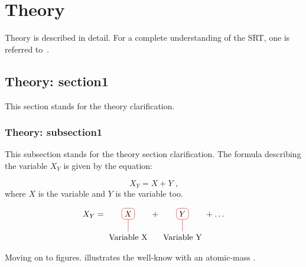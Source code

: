 \chapter{Theory}
\label{chapter:theory}

Theory is described in \gls{detail}.
For a complete understanding of the \acrshort{SRT}, one is referred to~\cite{ADP:Einstein:On_The_Electrodynamics_Of_Moving_Bodies}.


\section{Theory: section1}
\label{section:section1}

This section stands for the theory clarification.

\subsection{Theory: subsection1}
\label{subsection:subsection1}

This subsection stands for the theory section clarification.
The formula describing the variable \(X_{Y}\) is given by the equation:

\begin{equation}
    X_Y = X + Y \text{ ,}
    \label{equation:XY_equation}
\end{equation}
where \(X\) is the variable and \(Y\) is the variable too.

\begin{align}
    X_Y =
    \tikz[baseline]{
        \node[draw=red,rounded corners,anchor=base] (m1)
        {\(\displaystyle X\)};
        \node[below of=m1] (l1) {Variable X};
        \draw[-,red] (l1) -- (m1);
    }
    +
    \tikz[baseline]{
        \node[draw=red,rounded corners,anchor=base] (m2)
        {\(\displaystyle Y\)};
        \node[below of=m2] (l2) {Variable Y};
        \draw[-,red] (l2) -- (m2);
    }
    + \ldots
    \label{equation:XY_sum}
\end{align}

Moving on to figures.
 illustrates the well-know  with an \gls{atomic-mass} .

